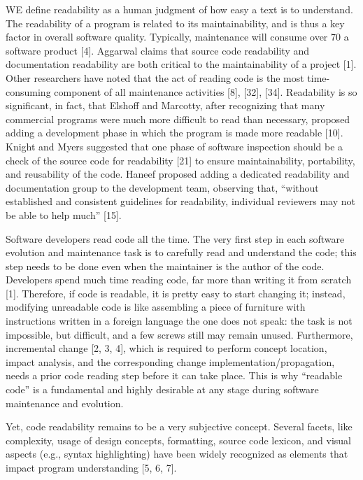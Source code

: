 \documentclass[%
class=scrreprt,
chapterprefix=false,%
open=right,%
twoside=false,%
paper=a4,%
logofile={Logo\_zentral\_farbig\_EN.png},%
thesistype=master,%
UKenglish,%
]{se2thesis}
\begin{document}
	WE define readability as a human judgment of how
	easy a text is to understand. The readability of a
	program is related to its maintainability, and is thus a key
	factor in overall software quality. Typically, maintenance
	will consume over 70%
	a software product [4]. Aggarwal claims that source
	code readability and documentation readability are both
	critical to the maintainability of a project [1]. Other
	researchers have noted that the act of reading code is
	the most time-consuming component of all maintenance
	activities [8], [32], [34]. Readability is so significant, in
	fact, that Elshoff and Marcotty, after recognizing that
	many commercial programs were much more difficult
	to read than necessary, proposed adding a development
	phase in which the program is made more readable [10].
	Knight and Myers suggested that one phase of software inspection should be a check of the source code
	for readability [21] to ensure maintainability, portability,
	and reusability of the code. Haneef proposed adding a
	dedicated readability and documentation group to the
	development team, observing that, “without established
	and consistent guidelines for readability, individual reviewers may not be able to help much” [15]. \cite{buse2009learning}
	
	
	Software developers read code all the time. The very first step in each software evolution and
	maintenance task is to carefully read and understand the code; this step needs to be done even
	when the maintainer is the author of the code. Developers spend much time reading code, far more
	than writing it from scratch [1]. Therefore, if code is readable, it is pretty easy to start changing it;
	instead, modifying unreadable code is like assembling a piece of furniture with instructions written
	in a foreign language the one does not speak: the task is not impossible, but difficult, and a few
	screws still may remain unused.
	Furthermore, incremental change [2, 3, 4], which is required to perform concept location, impact
	analysis, and the corresponding change implementation/propagation, needs a prior code reading
	step before it can take place. This is why “readable code” is a fundamental and highly desirable at
	any stage during software maintenance and evolution.\cite{scalabrino2018comprehensive}
	
	Yet, code readability remains to be a very subjective concept. Several facets, like complexity,
	usage of design concepts, formatting, source code lexicon, and visual aspects (e.g., syntax
	highlighting) have been widely recognized as elements that impact program understanding [5, 6, 7].	\cite{scalabrino2018comprehensive}
	
\end{document}

